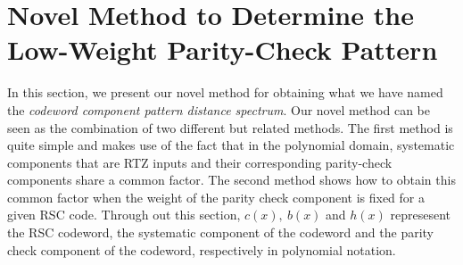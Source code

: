 \section{Novel Method to Determine the Low-Weight Parity-Check Pattern}
\label{sec3}
In this section, we present our novel method for obtaining what we have named the \textit{codeword component pattern distance spectrum}. %
Our novel method can be seen as the combination of two different but related methods. The first method is quite simple and makes use of the fact that in the polynomial domain, systematic components that are  RTZ inputs and their corresponding parity-check components share a common factor. 
The second method shows how to obtain this common factor when the weight of the parity check component is fixed for a given RSC code.  Through out this section, $c(x),~b(x)$ and $h(x)$ represesent the RSC codeword, the systematic component of the codeword and the parity check component of the codeword, respectively in polynomial notation.





\newpage







